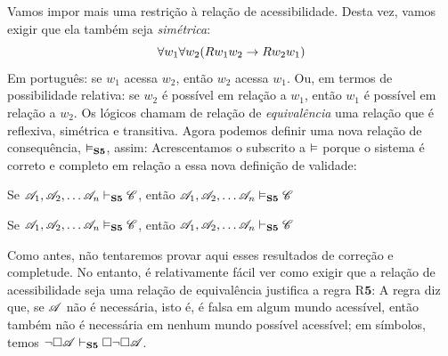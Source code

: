 Vamos impor mais uma restrição à relação de acessibilidade. Desta vez, vamos exigir que ela também seja \emph{simétrica}:
\[\forall w_1\forall w_2(Rw_1w_2 \rightarrow Rw_2w_1)\]
Em português: se $w_1$ acessa $w_2$, então $w_2$ acessa $w_1$. Ou, em termos de possibilidade relativa: se $w_2$ é possível em relação a $w_1$, então $w_1$ é possível em relação a $w_2$. Os lógicos chamam de relação de \emph{equivalência} uma relação que é reflexiva, simétrica e transitiva. Agora podemos definir uma nova relação de consequência, $\vDash_{\mathbf{S5}}$, assim:
Acrescentamos o subscrito \mlSfive{} a $\vDash$ porque o sistema \mlSfive{} é correto e completo em relação a essa nova definição de validade:
\begin{compactlist}
\item Se $\mathscr{A}_1,\mathscr{A}_2, \dots \mathscr{A}_n\vdash_{\mathbf{S5}} \mathscr{C}$, então $\mathscr{A}_1,\mathscr{A}_2, \dots \mathscr{A}_n\vDash_{\mathbf{S5}} \mathscr{C}$
\item Se $\mathscr{A}_1,\mathscr{A}_2, \dots \mathscr{A}_n\vDash_{\mathbf{S5}} \mathscr{C}$, então $\mathscr{A}_1,\mathscr{A}_2, \dots \mathscr{A}_n\vdash_{\mathbf{S5}} \mathscr{C}$
\end{compactlist}
Como antes, não tentaremos provar aqui esses resultados de correção e completude. No entanto, é relativamente fácil ver como exigir que a relação de acessibilidade seja uma relação de equivalência justifica a regra R$\mathbf{5}$:
A regra diz que, se $\mathscr{A}$ não é necessária, isto é, é falsa em algum mundo acessível, então também não é necessária em nenhum mundo possível acessível; em símbolos, temos $\neg\Box \mathscr{A} \vdash_{\mathbf{S5}}  \Box\neg\Box \mathscr{A}$.

